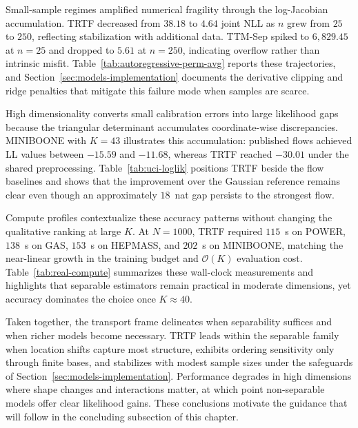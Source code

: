 \documentclass[11pt,a4paper,twoside]{book}\usepackage[]{graphicx}\usepackage[]{xcolor}
\begin{document}
Small-sample regimes amplified numerical fragility through the log-Jacobian accumulation. TRTF decreased from $38.18$ to $4.64$ joint NLL as $n$ grew from $25$ to $250$, reflecting stabilization with additional data. TTM-Sep spiked to $6{,}829.45$ at $n=25$ and dropped to $5.61$ at $n=250$, indicating overflow rather than intrinsic misfit. Table~\ref{tab:autoregressive-perm-avg} reports these trajectories, and Section~\ref{sec:models-implementation} documents the derivative clipping and ridge penalties that mitigate this failure mode when samples are scarce.

High dimensionality converts small calibration errors into large likelihood gaps because the triangular determinant accumulates coordinate-wise discrepancies. MINIBOONE with $K=43$ illustrates this accumulation: published flows achieved LL values between $-15.59$ and $-11.68$, whereas TRTF reached $-30.01$ under the shared preprocessing. Table~\ref{tab:uci-loglik} positions TRTF beside the flow baselines and shows that the improvement over the Gaussian reference remains clear even though an approximately $18$~nat gap persists to the strongest flow.

Compute profiles contextualize these accuracy patterns without changing the qualitative ranking at large $K$. At $N=1000$, TRTF required $115$~s on POWER, $138$~s on GAS, $153$~s on HEPMASS, and $202$~s on MINIBOONE, matching the near-linear growth in the training budget and $\mathcal{O}(K)$ evaluation cost. Table~\ref{tab:real-compute} summarizes these wall-clock measurements and highlights that separable estimators remain practical in moderate dimensions, yet accuracy dominates the choice once $K \approx 40$.

Taken together, the transport frame delineates when separability suffices and when richer models become necessary. TRTF leads within the separable family when location shifts capture most structure, exhibits ordering sensitivity only through finite bases, and stabilizes with modest sample sizes under the safeguards of Section~\ref{sec:models-implementation}. Performance degrades in high dimensions where shape changes and interactions matter, at which point non-separable models offer clear likelihood gains. These conclusions motivate the guidance that will follow in the concluding subsection of this chapter.
\end{document}
